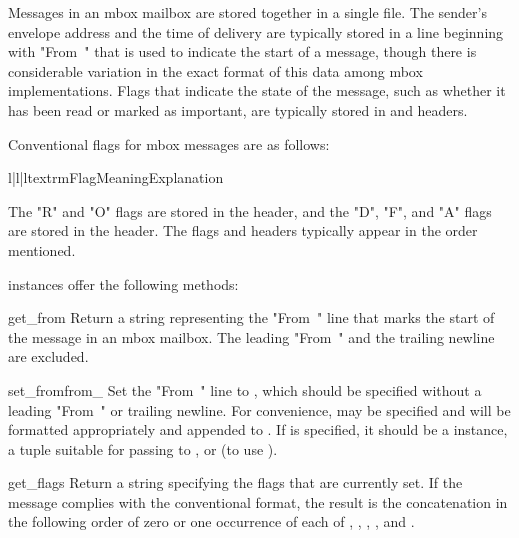 Messages in an mbox mailbox are stored together in a single file. The sender's
envelope address and the time of delivery are typically stored in a line
beginning with "From~" that is used to indicate the start of a message, though
there is considerable variation in the exact format of this data among mbox
implementations. Flags that indicate the state of the message, such as whether
it has been read or marked as important, are typically stored in
 and  headers.

Conventional flags for mbox messages are as follows:

\begin{tableiii}{l|l|l}{textrm}{Flag}{Meaning}{Explanation}
\end{tableiii}

The "R" and "O" flags are stored in the  header, and the
"D", "F", and "A" flags are stored in the  header. The
flags and headers typically appear in the order mentioned.

 instances offer the following methods:

\begin{methoddesc}{get_from}{}
Return a string representing the "From~" line that marks the start of the
message in an mbox mailbox. The leading "From~" and the trailing newline are
excluded.
\end{methoddesc}

\begin{methoddesc}{set_from}{from_}
Set the "From~" line to , which should be specified without a
leading "From~" or trailing newline. For convenience,  may be
specified and will be formatted appropriately and appended to . If
 is specified, it should be a  instance, a tuple
suitable for passing to , or  (to use
).
\end{methoddesc}

\begin{methoddesc}{get_flags}{}
Return a string specifying the flags that are currently set. If the message
complies with the conventional format, the result is the concatenation in the
following order of zero or one occurrence of each of ,
, , , and .
\end{methoddesc}

